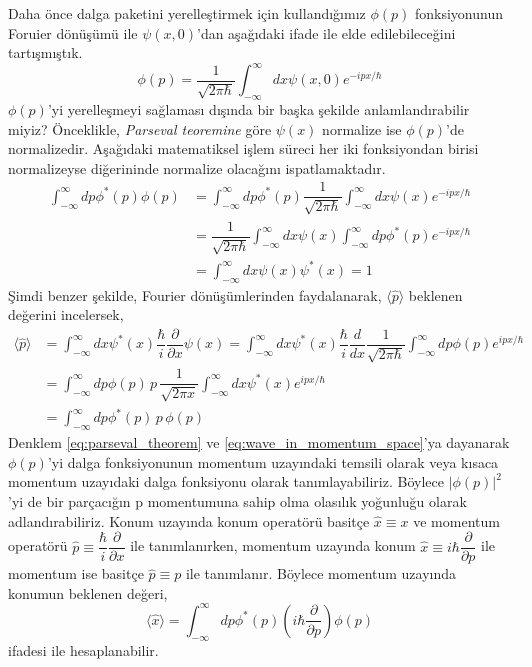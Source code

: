 \documentclass[a4paper,12pt, twoside]{article}
\begin{document}
Daha önce dalga paketini yerelleştirmek için kullandığımız $\phi(p)$ fonksiyonunun Foruier dönüşümü ile $\psi(x,0)$'dan aşağıdaki ifade ile elde edilebileceğini tartışmıştık.
\begin{equation}
\phi \left( p\right) =\dfrac {1}{\sqrt {2\pi \hbar }}\int ^{\infty }_{-\infty }dx\psi \left( x,0\right) e^{-ipx/\hbar }
\end{equation}
$\phi(p)$'yi yerelleşmeyi sağlaması dışında bir başka şekilde anlamlandırabilir miyiz? Önceklikle, \emph{Parseval teoremine} göre $\psi(x)$ normalize ise $\phi(p)$'de normalizedir. Aşağıdaki matematiksel işlem süreci her iki fonksiyondan birisi normalizeyse diğerininde normalize olacağını ispatlamaktadır.
\begin{align}
\int ^{\infty }_{-\infty }dp\phi ^{\ast }\left( p\right) \phi \left( p\right) &=\int ^{\infty }_{-\infty }dp\phi ^{\ast }\left( p\right) \dfrac {1}{\sqrt {2\pi \hbar }}\int ^{\infty }_{-\infty }dx\psi \left( x\right) e^{-ipx/\hbar }\nonumber \\
&=\dfrac {1}{\sqrt {2\pi \hbar }}\int ^{\infty }_{-\infty }dx\psi \left( x\right) \int ^{\infty }_{-\infty }dp\phi^\ast \left( p\right) e^{-ipx/\hbar }\nonumber \\
&=\int ^{\infty }_{-\infty }dx\psi \left( x\right) \psi ^{\ast }\left( x\right) = 1
\label{eq:parseval_theorem}
\end{align}
Şimdi benzer şekilde, Fourier dönüşümlerinden faydalanarak, $\langle \hat p \rangle$ beklenen değerini incelersek,
\begin{align}
\langle \hat p\rangle &=\int ^{\infty }_{-\infty }dx\psi^\ast \left( x\right) \dfrac {\hbar }{i}\dfrac {\partial}{\partial x}\psi \left( x\right) =\int ^{\infty }_{-\infty }dx\psi^\ast \left( x\right) \dfrac {\hbar }{i}\dfrac {d}{dx}\dfrac {1}{\sqrt {2\pi \hbar }}\int ^{\infty }_{-\infty }dp\phi \left( p\right) e^{ipx/\hbar }\nonumber \\
&=\int ^{\infty }_{-\infty }dp\phi \left( p\right) \,p\, \dfrac {1}{\sqrt {2\pi x}}\int ^{\infty }_{-\infty }dx\psi ^{\ast }\left( x\right) e^{ipx/\hbar }\nonumber \\
&= \int ^{\infty }_{-\infty }dp\phi ^{\ast }(p)\,p\,\phi(p)
\label{eq:wave_in_momentum_space} 
\end{align}
Denklem \ref{eq:parseval_theorem} ve \ref{eq:wave_in_momentum_space}'ya dayanarak $\phi(p)$'yi dalga fonksiyonunun momentum uzayındaki temsili olarak veya kısaca momentum uzayıdaki dalga fonksiyonu olarak tanımlayabiliriz. Böylece $|\phi(p)|^2$'yi de bir parçacığın p momentumuna sahip olma olasılık yoğunluğu olarak adlandırabiliriz. Konum uzayında konum operatörü basitçe $\hat x \equiv x$ ve momentum operatörü $\hat p \equiv \dfrac{\hbar}{i}\dfrac{\partial}{\partial x}$ ile tanımlanırken, momentum uzayında konum $\hat x \equiv i \hbar\dfrac{\partial}{\partial p}$ ile momentum ise basitçe $\hat p \equiv p$ ile tanımlanır. Böylece momentum uzayında konumun beklenen değeri,
\begin{equation}
\langle \hat x \rangle =  \int ^{\infty }_{-\infty }dp\phi ^{\ast }(p)\left(i\hbar\dfrac{\partial}{\partial p}\right)\phi(p)
\end{equation}
ifadesi ile hesaplanabilir.
\end{document}
